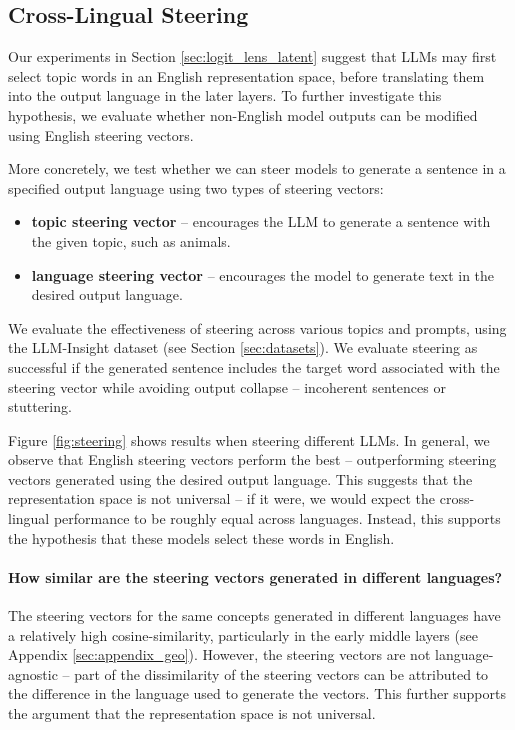 \subsection{Cross-Lingual Steering} \label{sec:steering}

Our experiments in Section \ref{sec:logit_lens_latent} suggest that LLMs may first select topic words in an English representation space, before translating them into the output language in the later layers. 
To further investigate this hypothesis, we evaluate whether non-English model outputs can be modified using English steering vectors.

More concretely, we test whether we can steer models to generate a sentence in a specified output language using two types of steering vectors:
    \begin{itemize}
        \item \textbf{topic steering vector} -- encourages the LLM to generate a sentence with the given topic, such as animals.
        \item \textbf{language steering vector} -- encourages the model to generate text in the desired output language. 
    \end{itemize}
We evaluate the effectiveness of steering across various topics and prompts, using the LLM-Insight dataset (see Section \ref{sec:datasets}). 
We evaluate steering as successful if the generated sentence includes the target word associated with the steering vector while avoiding output collapse -- incoherent sentences or stuttering. 

Figure \ref{fig:steering} shows results when steering different LLMs.
In general, we observe that English steering vectors perform the best -- outperforming steering vectors generated using the desired output language. 
This suggests that the representation space is not universal -- if it were, we would expect the cross-lingual performance to be roughly equal across languages. Instead, this supports the hypothesis that these models select these words in English.


\paragraph{How similar are the steering vectors generated in different languages?}
The steering vectors for the same concepts generated in different languages have a relatively high cosine-similarity, particularly in the early middle layers (see Appendix \ref{sec:appendix_geo}). However, the steering vectors are not language-agnostic -- part of the dissimilarity of the steering vectors can be attributed to the difference in the language used to generate the vectors. This further supports the argument that the representation space is not universal. 

